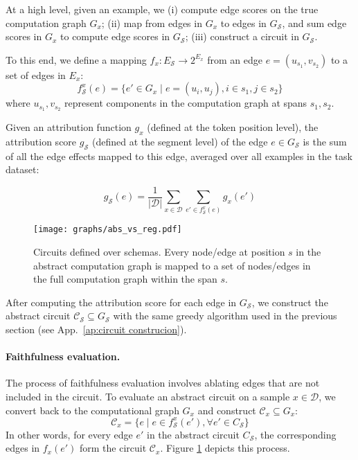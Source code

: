 At a high level, given an example, we (i) compute edge scores on the true computation graph $G_x$;
(ii) map from edges in $G_x$ to edges in $G_\mathcal{S}$, and sum edge scores in $G_x$ to compute edge scores in $G_\mathcal{S}$;
(iii) construct a circuit in $G_\mathcal{S}$.


To this end, we define a mapping $f_{x}: E_{\mathcal{S}} \rightarrow 2^{E_x}$ from an edge $e=(u_{s_1},v_{s_2})$ to a set of edges in $E_x$:
%
\begin{equation}
    f_{\mathcal{S}}^x(e)=\{ e'\in G_x \mid e=(u_i, u_j), i \in s_1, j\in s_2 \}
\end{equation}
%
where $u_{s_1},v_{s_2}$ represent components in the computation graph at spans $s_1, s_2$. 

Given an attribution function $g_x$ (defined at the token position level), the attribution score $g_\mathcal{S}$ (defined at the segment level) of the edge $e\in G_{\mathcal{S}}$ is the sum of all the edge effects mapped to this edge, averaged over all examples in the task dataset:

\begin{equation}
    g_{\mathcal{S}}(e) = \frac{1}{|\mathcal{D}|}\sum_{x \in \mathcal{D}}\sum_{e' \in f^x_\mathcal{S}(e)} g_{x}(e')
\end{equation}

\begin{figure}[t]
    \centering
    \texttt{[image: graphs/abs\_vs\_reg.pdf]}
    \caption{Circuits defined over schemas. Every node/edge at position \( s \) in the abstract computation graph is mapped to a set of nodes/edges in the full computation graph within the span \( s \).}
    \label{fig:abs_graph}
\end{figure}

After computing the attribution score for each edge in $G_{\mathcal{S}}$, we construct the abstract circuit  $\mathcal{C}_{\mathcal{S}} \subseteq G_{\mathcal{S}}$ with the same greedy algorithm used in the previous section (see App.~\ref{ap:circuit construcion}).

\paragraph{Faithfulness evaluation.}
The process of faithfulness evaluation involves ablating edges that are not included in the circuit. 
To evaluate an abstract circuit on a sample $x\in\mathcal{D}$, we convert back to the computational graph $G_x$ and construct $\mathcal{C}_x \subseteq G_x$:
\begin{equation}
\mathcal{C}_x = \{ e \mid e \in f^x_\mathcal{S}(e'), \forall e' \in C_{\mathcal{S}} \}
\end{equation}
In other words, for every edge $e'$ in the abstract circuit $C_{\mathcal{S}}$, the corresponding edges in $f_x(e')$ form the circuit $\mathcal{C}_x$.
Figure \ref{fig:abs_graph} depicts this process.


